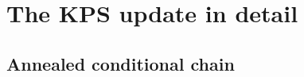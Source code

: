 %

\section{The KPS update in detail} \label{appendice:method}

\subsection{Annealed conditional chain} \label{appendice:annealed}

